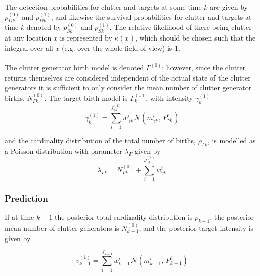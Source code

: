 \documentclass{article}
\begin{document}
The detection probabilities for clutter and targets at some time $k$ are given by $p_{Dk}^{(0)}$ and $p_{Dk}^{(1)}$, and likewise the survival probabilities for clutter and targets at time $k$ denoted by $p_{Sk}^{(0)}$ and $p_{Sk}^{(1)}$. The relative likelihood of there being clutter at any location $x$ is represented by $\kappa(x)$, which should be chosen such that the integral over all $x$ (e.g. over the whole field of view) is $1$.\\
\\
The clutter generator birth model is denoted $\Gamma^{(0)}$; however, since the clutter returns themselves are considered independent of the actual state of the clutter generators it is sufficient to only consider the mean number of clutter generator births, $N_{\Gamma k}^{(0)}$. The target birth model is $\Gamma^{(1)}_k$, with intensity $\gamma^{(1)}_k$
\begin{equation}
  \label{eq:tgt_birth}
\gamma^{(1)}_k = \sum_{i=1}^{J_{\gamma k}^{(1)}}w_{\gamma k}^i \mathcal{N}(m_{\gamma k}^i,\,P_{\gamma k}^i)
\end{equation}

and the cardinality distribution of the total number of births, $\ddot{\rho}_{\Gamma k}$, is modelled as a Poisson distribution with parameter $\lambda_\Gamma$ given by
\begin{equation}
  \label{eq:rho_gamma}
\lambda_{\Gamma k} = N_{\Gamma k}^{(0)} + \sum_{i=1}^{J_{\gamma k}^{(1)}}w_{\gamma k}^i 
\end{equation}

\subsubsection{Prediction}
If at time $k-1$ the posterior total cardinality distribution is $\ddot{\rho_{k-1}}$, the posterior mean number of clutter generators is $N^{(0)}_{k-1}$, and the posterior target intensity is given by

\begin{equation}
  \label{eq:vk}
  v^{(1)}_{k-1} = \sum_{i = 1}^{J_{k-1}}w_{k-1}^i \mathcal{N}(m_{k-1}^i,\,P_{k-1}^i)
\end{equation}
\end{document}
